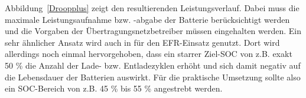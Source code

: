 \newpage
Abbildung~\ref{Droopplus} zeigt den resultierenden Leistungsverlauf.
Dabei muss die maximale Leistungsaufnahme bzw. -abgabe der Batterie berücksichtigt werden und die Vorgaben der
Übertragungsnetzbetreiber müssen eingehalten werden.
Ein sehr ähnlicher Ansatz wird auch in \parencite[]{mantar_gundogdu_battery_2018} für den EFR-Einsatz genutzt.
Dort wird allerdings noch einmal hervorgehoben, dass ein starrer Ziel-SOC von z.B. exakt 50 \% die 
Anzahl der Lade- bzw. Entladezyklen erhöht und sich damit negativ auf die Lebensdauer der Batterien auswirkt.
Für die praktische Umsetzung sollte also ein SOC-Bereich von z.B. 45 \% bis 55 \% angestrebt werden.
